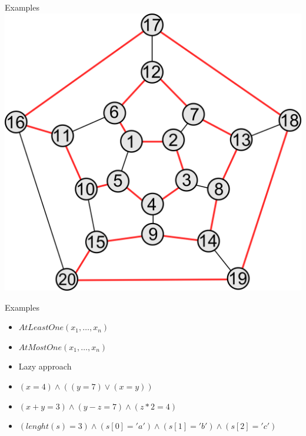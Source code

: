 \documentclass[mathserif]{beamer}
\begin{document}
\begin{frame}{Examples}
\includegraphics[scale=0.45]{hamiltonial.png}
\end{frame}

\begin{frame}{Examples}
\begin{itemize}
\item $AtLeastOne(x_1, \dots, x_n)$
\item $AtMostOne(x_1, \dots, x_n)$
\item Lazy approach
\end{itemize}
\end{frame}

\begin{frame}{}
\begin{itemize}
\item $(x = 4) \wedge ((y = 7) \vee (x = y))$
\item $(x + y = 3) \wedge (y - z = 7) \wedge (z * 2 = 4)$
\item $(lenght(s) = 3) \wedge (s[0] = 'a') \wedge (s[1] = 'b') \wedge (s[2] = 'c')$
\end{itemize}
\end{frame}
\end{document}
